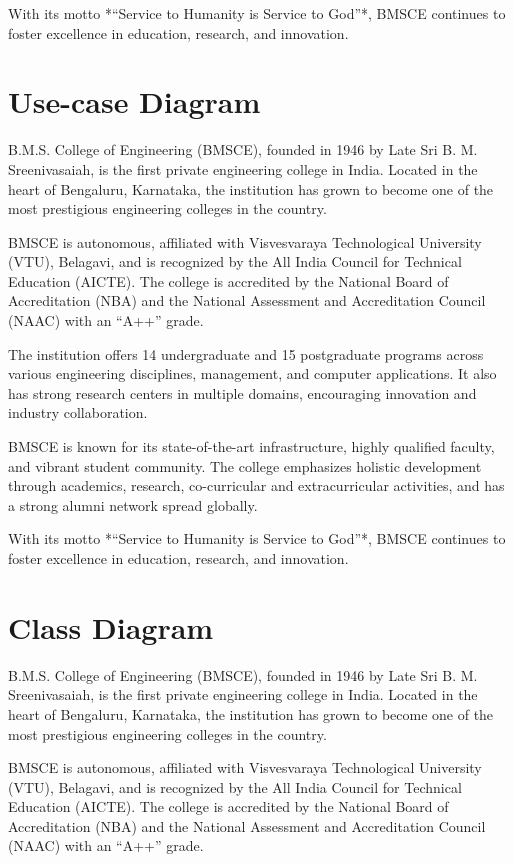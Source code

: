 \documentclass[12pt,a4paper]{report}
\begin{document}
With its motto *“Service to Humanity is Service to God”*, BMSCE continues to foster 
excellence in education, research, and innovation.
\section{Use-case Diagram }
B.M.S. College of Engineering (BMSCE), founded in 1946 by Late Sri B. M. Sreenivasaiah, 
is the first private engineering college in India. Located in the heart of Bengaluru, 
Karnataka, the institution has grown to become one of the most prestigious engineering 
colleges in the country. 

BMSCE is autonomous, affiliated with Visvesvaraya Technological University (VTU), Belagavi, 
and is recognized by the All India Council for Technical Education (AICTE). The college is 
accredited by the National Board of Accreditation (NBA) and the National Assessment and 
Accreditation Council (NAAC) with an “A++” grade.

The institution offers 14 undergraduate and 15 postgraduate programs across various 
engineering disciplines, management, and computer applications. It also has strong research 
centers in multiple domains, encouraging innovation and industry collaboration. 

BMSCE is known for its state-of-the-art infrastructure, highly qualified faculty, and vibrant 
student community. The college emphasizes holistic development through academics, research, 
co-curricular and extracurricular activities, and has a strong alumni network spread 
globally. 

With its motto *“Service to Humanity is Service to God”*, BMSCE continues to foster 
excellence in education, research, and innovation.
\section{Class Diagram}
B.M.S. College of Engineering (BMSCE), founded in 1946 by Late Sri B. M. Sreenivasaiah, 
is the first private engineering college in India. Located in the heart of Bengaluru, 
Karnataka, the institution has grown to become one of the most prestigious engineering 
colleges in the country. 

BMSCE is autonomous, affiliated with Visvesvaraya Technological University (VTU), Belagavi, 
and is recognized by the All India Council for Technical Education (AICTE). The college is 
accredited by the National Board of Accreditation (NBA) and the National Assessment and 
Accreditation Council (NAAC) with an “A++” grade.
\end{document}
